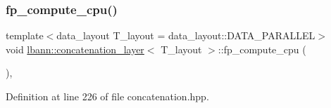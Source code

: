 \subsubsection{\texorpdfstring{fp\+\_\+compute\+\_\+cpu()}{fp\_compute\_cpu()}}
{\footnotesize\ttfamily template$<$data\+\_\+layout T\+\_\+layout = data\+\_\+layout\+::\+D\+A\+T\+A\+\_\+\+P\+A\+R\+A\+L\+L\+EL$>$ \\
void \hyperlink{classlbann_1_1concatenation__layer}{lbann\+::concatenation\+\_\+layer}$<$ T\+\_\+layout $>$\+::fp\+\_\+compute\+\_\+cpu (\begin{DoxyParamCaption}{ }\end{DoxyParamCaption})\hspace{0.3cm}{\ttfamily [inline]}, {\ttfamily [protected]}}



Definition at line 226 of file concatenation.\+hpp.


